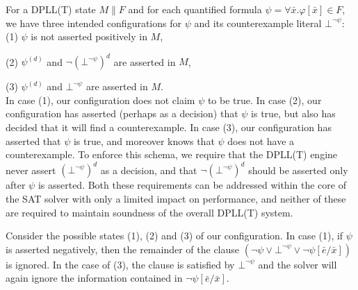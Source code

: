 \documentclass{llncs}
\begin{document}
For a DPLL(T) state $M \parallel F$ and for each quantified formula $\psi = \forall \bar{ x }. \varphi[ \bar{ x } ] \in F$, we have three intended configurations for $\psi$ and its counterexample literal $\bot^{\neg \psi}$: \\

(1) $\psi$ is not asserted positively in $M$, 

(2) $\psi^{(d)}$ and $\neg (\bot^{\neg \psi})^d$ are asserted in $M$, 

(3) $\psi^{(d)}$ and $\bot^{\neg \psi}$ are asserted in $M$. \\

In case (1), our configuration does not claim $\psi$ to be true.
In case (2), our configuration has asserted (perhaps as a decision) that $\psi$ is true, but also has decided that it will find a counterexample.
In case (3), our configuration has asserted that $\psi$ is true, and moreover knows that $\psi$ does not have a counterexample.
To enforce this schema, we require that the DPLL(T) engine never assert $(\bot^{\neg \psi})^d$ as a decision, and that $\neg (\bot^{\neg \psi})^d$ should be asserted only after $\psi$ is asserted.
Both these requirements can be addressed within the core of the SAT solver with only a limited impact on performance, and neither of these are required to maintain soundness of the overall DPLL(T) system.


Consider the possible states (1), (2) and (3) of our configuration.
In case (1), if $\psi$ is asserted negatively, then the remainder of the clause $( \neg \psi \vee \bot^{\neg \psi} \vee \neg \psi[\bar{e}/\bar{x}])$ is ignored.
In the case of (3), the clause is satisfied by $\bot^{\neg \psi}$ and the solver will again ignore the information contained in $\neg \psi[\bar{e}/\bar{x}]$.
\end{document}
